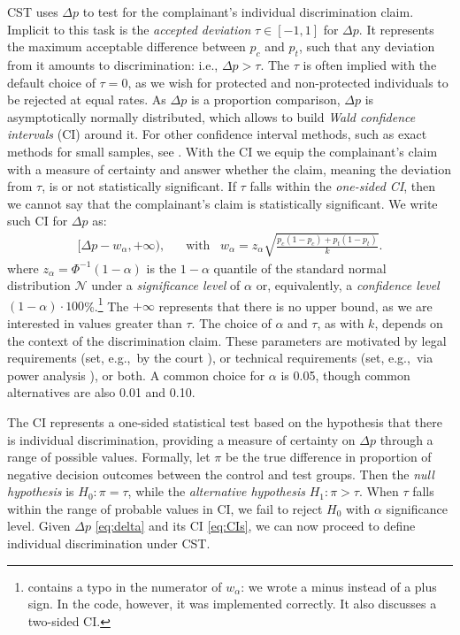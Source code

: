 CST uses $\Delta p$ to test for the complainant's individual discrimination claim. 
Implicit to this task is the \textit{accepted deviation} $\tau \in [-1, 1]$ for $\Delta p$.
%
It represents the maximum acceptable difference between $p_c$ and $p_t$, such that any deviation from it amounts to discrimination: i.e., $\Delta p > \tau$. 
The $\tau$ is often implied with the default choice of $\tau=0$, as we wish for protected and non-protected individuals to be rejected at equal rates.
%
As $\Delta p$ is a proportion comparison, $\Delta p$ is asymptotically normally distributed, which allows to build \textit{Wald confidence intervals} (CI) around it. For other confidence interval methods, such as exact methods for small samples, see \textcite{Newcombe1998}.
With the CI we equip the complainant's claim with a measure of certainty and answer whether the claim, meaning the deviation from $\tau$, is or not statistically significant.
If $\tau$ falls within the \textit{one-sided CI}, then we cannot say that the complainant's claim is statistically significant.
We write such CI for $\Delta p$ as:
%
\begin{align}
\label{eq:CIs}
    [\Delta p - w_{\alpha}, + \infty),
    & \; \; \; \text{with} \; \; \;
    w_{\alpha} =  z_{\alpha} \sqrt{\frac{p_c(1 - p_c) + p_t(1 - p_t)}{k}}.
\end{align}
%
where $z_{\alpha} = \Phi^{-1}(1-\alpha)$ is the $1-\alpha$ quantile of the standard normal distribution $\mathcal{N}$ under a \textit{significance level} of $\alpha$ or, equivalently, a \textit{confidence level} $(1 - \alpha) \cdot 100$\%.\footnote{\textcite{DBLP:conf/eaamo/AlvarezR23} contains a typo in the numerator of $w_{\alpha}$: we wrote a minus instead of a plus sign. In the code, however, it was implemented correctly. It also discusses a two-sided CI.}
The $+ \infty$ represents that there is no upper bound, as we are interested in values greater than $\tau$.
%
The choice of $\alpha$ and $\tau$, as with $k$, depends on the context of the discrimination claim. 
These parameters are motivated by legal requirements (set, e.g.,~by the court \parencite{Thanh_KnnSituationTesting2011}), or technical requirements (set, e.g.,~via power analysis \parencite{Cohen2013StatisticalPower}), or both.
A common choice for $\alpha$ is 0.05, though common alternatives are also 0.01 and 0.10. 

The CI represents a one-sided statistical test based on the hypothesis that there is individual discrimination, providing a measure of certainty on $\Delta p$ through a range of possible values.
Formally, 
let $\pi$ be the true difference in proportion of negative decision outcomes between the control and test groups. Then the \textit{null hypothesis} is $H_0: \pi = \tau$, while the \textit{alternative hypothesis} $H_1: \pi > \tau$.
When $\tau$ falls within the range of probable values in CI, we fail to reject $H_0$ with $\alpha$ significance level.
Given $\Delta p$ \eqref{eq:delta} and its CI \eqref{eq:CIs}, we can now proceed to define individual discrimination under CST.

